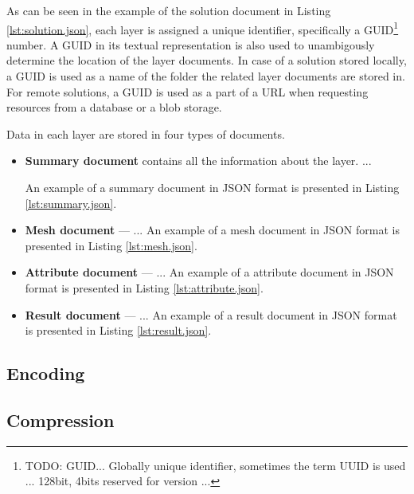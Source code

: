 As can be seen in the example of the solution document in Listing \ref{lst:solution.json}, each layer is assigned a unique identifier, specifically a GUID\footnote{TODO: GUID... Globally unique identifier, sometimes the term UUID is used ... 128bit, 4bits reserved for version ...} number. A GUID in its textual representation is also used to unambigously determine the location of the layer documents. In case of a solution stored locally, a GUID is used as a name of the folder the related layer documents are stored in. For remote solutions, a GUID is used as a part of a URL when requesting resources from a database or a blob storage.

Data in each layer are stored in four types of documents.
\begin{itemize}
    \item \textbf{Summary document} contains all the information about the layer. ...
    
    An example of a summary document in JSON format is presented in Listing \ref{lst:summary.json}.
    \item \textbf{Mesh document} --- ... An example of a mesh document in JSON format is presented in Listing \ref{lst:mesh.json}.
    \item \textbf{Attribute document} --- ... An example of a attribute document in JSON format is presented in Listing \ref{lst:attribute.json}.
    \item \textbf{Result document} --- ... An example of a result document in JSON format is presented in Listing \ref{lst:result.json}.
\end{itemize}


\subsection {Encoding}

\subsection {Compression}

